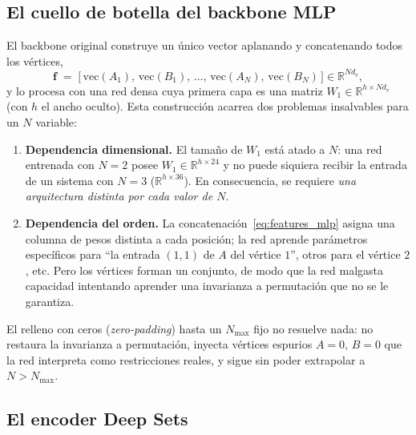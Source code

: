 \subsection{El cuello de botella del backbone MLP}
\label{subsec:cuello_mlp}

El backbone original construye un único vector aplanando y concatenando todos los vértices,
\begin{equation}
    \mathbf{f} \;=\; \big[\,\mathrm{vec}(A_1),\,\mathrm{vec}(B_1),\,\dots,\,
    \mathrm{vec}(A_N),\,\mathrm{vec}(B_N)\,\big] \in \mathbb{R}^{N d_v},
    \label{eq:features_mlp}
\end{equation}
y lo procesa con una red densa cuya primera capa es una matriz
$W_1 \in \mathbb{R}^{h \times N d_v}$ (con $h$ el ancho oculto). Esta construcción acarrea
dos problemas insalvables para un $N$ variable:

\begin{enumerate}
    \item \textbf{Dependencia dimensional.} El tamaño de $W_1$ está atado a $N$: una red
    entrenada con $N=2$ posee $W_1 \in \mathbb{R}^{h\times 24}$ y no puede siquiera recibir
    la entrada de un sistema con $N=3$ ($\mathbb{R}^{h\times 36}$). En consecuencia, se
    requiere \emph{una arquitectura distinta por cada valor de $N$}.
    \item \textbf{Dependencia del orden.} La concatenación~\eqref{eq:features_mlp} asigna una
    columna de pesos distinta a cada posición; la red aprende parámetros específicos para
    ``la entrada $(1,1)$ de $A$ del vértice $1$'', otros para el vértice $2$, etc. Pero los
    vértices forman un conjunto, de modo que la red malgasta capacidad intentando aprender
    una invarianza a permutación que no se le garantiza.
\end{enumerate}

El relleno con ceros (\textit{zero-padding}) hasta un $N_{\max}$ fijo no resuelve nada: no
restaura la invarianza a permutación, inyecta vértices espurios $A=0,\,B=0$ que la red
interpreta como restricciones reales, y sigue sin poder extrapolar a $N > N_{\max}$.

\subsection{El encoder Deep Sets}
\label{subsec:deepsets}

